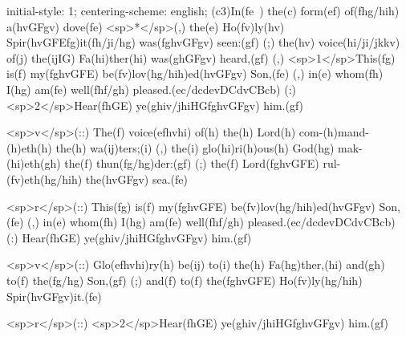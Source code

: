 initial-style: 1;
centering-scheme: english;
(c3)In(fe~) the(c) form(ef) of(fhg/hih) a(hvGFgv) dove(fe) <sp>*</sp>(,) the(e) Ho(fv)ly(hv) Spir(hvGFEfg)it(fh/ji/hg) was(fghvGFgv) seen:(gf) (;) the(hv) voice(hi/ji/jkkv) of(j) the(ijIG) Fa(hi)ther(hi) was(ghGFgv) heard,(gf) (,) <sp>1</sp>This(fg) is(f) my(fghvGFE) be(fv)lov(hg/hih)ed(hvGFgv) Son,(fe) (,) in(e) whom(fh) I(hg) am(fe) well(fhf/gh) pleased.(ec/dcdevDCdvCBcb) (:) <sp>2</sp>Hear(fhGE) ye(ghiv/jhiHGfghvGFgv) him.(gf)

<sp>v</sp>(::) The(f) voice(efhvhi) of(h) the(h) Lord(h) com-(h)mand-(h)eth(h) the(h) wa(ij)ters;(i) (,) the(i) glo(hi)ri(h)ous(h) God(hg) mak-(hi)eth(gh) the(f) thun(fg/hg)der:(gf) (;) the(f) Lord(fghvGFE) rul-(fv)eth(hg/hih) the(hvGFgv) sea.(fe)

<sp>r</sp>(::) This(fg) is(f) my(fghvGFE) be(fv)lov(hg/hih)ed(hvGFgv) Son,(fe) (,) in(e) whom(fh) I(hg) am(fe) well(fhf/gh) pleased.(ec/dcdevDCdvCBcb) (:) Hear(fhGE) ye(ghiv/jhiHGfghvGFgv) him.(gf)

<sp>v</sp>(::) Glo(efhvhi)ry(h) be(ij) to(i) the(h) Fa(hg)ther,(hi) and(gh) to(f) the(fg/hg) Son,(gf) (;) and(f) to(f) the(fghvGFE) Ho(fv)ly(hg/hih) Spir(hvGFgv)it.(fe)

<sp>r</sp>(::) <sp>2</sp>Hear(fhGE) ye(ghiv/jhiHGfghvGFgv) him.(gf)